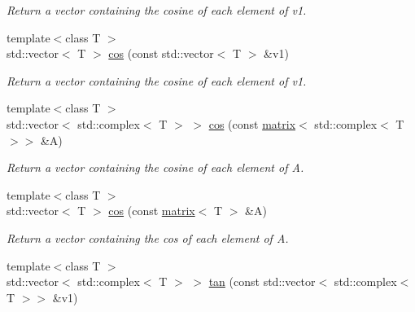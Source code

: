 \begin{DoxyCompactItemize}
\begin{DoxyCompactList}\small\item\em Return a vector containing the cosine of each element of v1. \end{DoxyCompactList}\item 
\hypertarget{namespacekeycpp_a51d6592d124735f2377e1a2c43985b94}{{\footnotesize template$<$class T $>$ }\\std\-::vector$<$ T $>$ \hyperlink{namespacekeycpp_a51d6592d124735f2377e1a2c43985b94}{cos} (const std\-::vector$<$ T $>$ \&v1)}\label{namespacekeycpp_a51d6592d124735f2377e1a2c43985b94}

\begin{DoxyCompactList}\small\item\em Return a vector containing the cosine of each element of v1. \end{DoxyCompactList}\item 
\hypertarget{namespacekeycpp_a6b8f8e6c241ddcb678acf54c03a89b08}{{\footnotesize template$<$class T $>$ }\\std\-::vector$<$ std\-::complex$<$ T $>$ $>$ \hyperlink{namespacekeycpp_a6b8f8e6c241ddcb678acf54c03a89b08}{cos} (const \hyperlink{classkeycpp_1_1matrix}{matrix}$<$ std\-::complex$<$ T $>$$>$ \&A)}\label{namespacekeycpp_a6b8f8e6c241ddcb678acf54c03a89b08}

\begin{DoxyCompactList}\small\item\em Return a vector containing the cosine of each element of A. \end{DoxyCompactList}\item 
\hypertarget{namespacekeycpp_abc28105b536bc99365073d7cbe0f9910}{{\footnotesize template$<$class T $>$ }\\std\-::vector$<$ T $>$ \hyperlink{namespacekeycpp_abc28105b536bc99365073d7cbe0f9910}{cos} (const \hyperlink{classkeycpp_1_1matrix}{matrix}$<$ T $>$ \&A)}\label{namespacekeycpp_abc28105b536bc99365073d7cbe0f9910}

\begin{DoxyCompactList}\small\item\em Return a vector containing the cos of each element of A. \end{DoxyCompactList}\item 
\hypertarget{namespacekeycpp_a1fbb76498765f30f7a95c80ce7491d28}{{\footnotesize template$<$class T $>$ }\\std\-::vector$<$ std\-::complex$<$ T $>$ $>$ \hyperlink{namespacekeycpp_a1fbb76498765f30f7a95c80ce7491d28}{tan} (const std\-::vector$<$ std\-::complex$<$ T $>$$>$ \&v1)}\label{namespacekeycpp_a1fbb76498765f30f7a95c80ce7491d28}


\end{DoxyCompactItemize}
